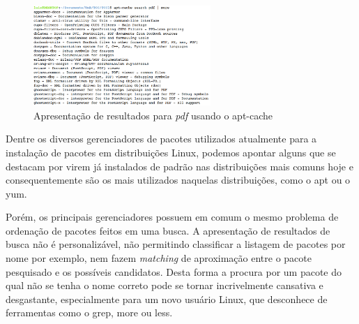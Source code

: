 \begin{figure}[h]
  \centering
	\includegraphics[width=0.6\textwidth]{figuras/search_pdf}
  \caption{Apresentação de resultados para \textit{pdf} usando o {\code apt-cache}}
  \label{fig:figuras_search_pdf}
\end{figure}

Dentre os diversos gerenciadores de pacotes utilizados atualmente para a instalação de pacotes em distribuições Linux, podemos apontar alguns que se destacam por virem já instalados de padrão nas distribuições mais comuns hoje e consequentemente são os mais  utilizados naquelas distribuições, como o {\code apt} ou o {\code yum}.

Porém, os principais gerenciadores possuem em comum o mesmo problema de ordenação de pacotes feitos em uma busca. A apresentação de resultados de busca não é personalizável, não permitindo classificar a listagem de pacotes por nome por exemplo, nem fazem \textit{matching} de aproximação  entre o pacote pesquisado e os possíveis candidatos. Desta forma a procura por um pacote do qual não se tenha o nome correto pode se tornar incrivelmente cansativa e desgastante, especialmente para um novo usuário Linux, que desconhece de ferramentas como o {\code grep, more} ou {\code  less}. 
